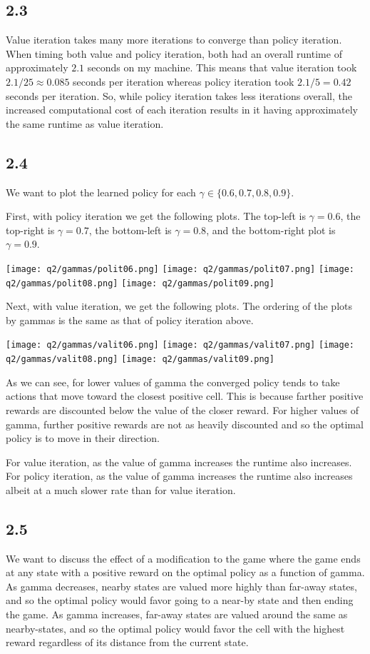 \documentclass[submit]{harvardml}
\begin{document}
\subsection*{2.3}
Value iteration takes many more iterations to converge than policy iteration. When timing both value and policy iteration, both had an overall runtime of approximately $2.1$ seconds on my machine. This means that value iteration took $2.1 / 25 \approx 0.085$ seconds per iteration whereas policy iteration took $2.1 / 5 = 0.42$ seconds per iteration. So, while policy iteration takes less iterations overall, the increased computational cost of each iteration results in it having approximately the same runtime as value iteration.

\newpage
\subsection*{2.4}
We want to plot the learned policy for each $\gamma \in \{0.6, 0.7, 0.8, 0.9\}$.

First, with policy iteration we get the following plots. The top-left is $\gamma = 0.6$, the top-right is $\gamma =0.7$, the bottom-left is $\gamma = 0.8$, and the bottom-right plot is $\gamma = 0.9.$

\texttt{[image: q2/gammas/polit06.png]}
\texttt{[image: q2/gammas/polit07.png]}
\texttt{[image: q2/gammas/polit08.png]}
\texttt{[image: q2/gammas/polit09.png]}

Next, with value iteration, we get the following plots. The ordering of the plots by gammas is the same as that of policy iteration above.

\texttt{[image: q2/gammas/valit06.png]}
\texttt{[image: q2/gammas/valit07.png]}
\texttt{[image: q2/gammas/valit08.png]}
\texttt{[image: q2/gammas/valit09.png]}

As we can see, for lower values of gamma the converged policy tends to take actions that move toward the closest positive cell. This is because farther positive rewards are discounted below the value of the closer reward. For higher values of gamma, further positive rewards are not as heavily discounted and so the optimal policy is to move in their direction.

For value iteration, as the value of gamma increases the runtime also increases. For policy iteration, as the value of gamma increases the runtime also increases albeit at a much slower rate than for value iteration.

\subsection*{2.5}
We want to discuss the effect of a modification to the game where the game ends at any state with a positive reward on the optimal policy as a function of gamma. As gamma decreases, nearby states are valued more highly than far-away states, and so the optimal policy would favor going to a near-by state and then ending the game. As gamma increases, far-away states are valued around the same as nearby-states, and so the optimal policy would favor the cell with the highest reward regardless of its distance from the current state.
\end{document}

